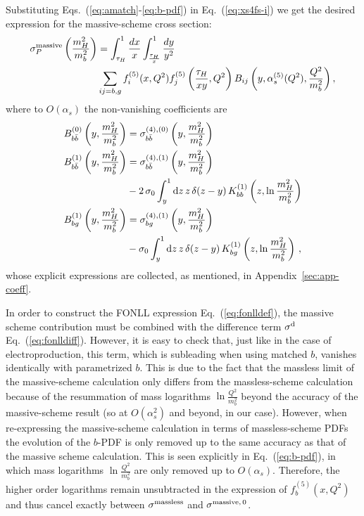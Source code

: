 Substituting Eqs.~(\ref{eq:amatch}-\ref{eq:b-pdf}) in
Eq.~(\ref{eq:xs4fs-i}) we get the desired expression for the
massive-scheme cross section:
\begin{equation}
  \label{massive:1}
  \begin{split}
  \sigma_P^{\rm
    massive}\left(\frac{m_H^2}{m_b^2}\right)&=
  \int_{\tau_H}^{1} \frac{dx}{x}\int_{\frac{\tau_H}{x}}^{1}
  \frac{dy}{y^2} \\
  &\sum_{ij=b,g}f_{i}^{(5)}(x,Q^2)f_j^{(5)}
  \left(\frac{\tau_H}{x y},Q^2\right)
  B_{ij}\left(y,\alpha_s^{(5)}(Q^2),
    \frac{Q^2}{m_b^2}\right),
  \end{split}
\end{equation}
where to $O(\alpha_s)$ the non-vanishing coefficients are 
\begin{align}
  \label{eq:change-of-scheme}
  B_{b\bar{b}}^{(0)}\left(y,\frac{m_H^2}{m_b^2}\right)  
    & = \sigma_{b\bar{b}}^{(4),(0)}\left(y,\frac{m_H^2}{m_b^2}\right) \\
  B_{b\bar{b}}^{(1)}\left(y,\frac{m_H^2}{m_b^2}\right)
    & = \sigma_{b\bar{b}}^{(4),(1)}\left(y,\frac{m_H^2}{m_b^2}\right) \nonumber\\ 
    & - 2\,\sigma_0
      \int_{y}^{1}{\rm d} z \,z\,\delta(z-y)\,
      K_{bb}^{(1)}\left(z,\ln\frac{m_H^2}{m_b^2}\right)\\
  B_{bg}^{(1)}\left(y,\frac{m_H^2}{m_b^2}\right)
    & = \sigma_{bg}^{(4),(1)}\left(y,\frac{m_H^2}{m_b^2}\right) \nonumber \\
    &  -\sigma_0
      \int_{y}^{1}{\rm d} z \,z\,\delta(z-y)\,
      K_{bg}^{(1)}\left(z,\ln\frac{m_H^2}{m_b^2}\right)\,,
\end{align}
whose explicit expressions are collected, as mentioned, in Appendix~\ref{sec:app-coeff}.

In order to construct the FONLL expression Eq.~(\ref{eq:fonlldef}), the
massive scheme contribution must be combined with the difference term
$\sigma ^{\rm d}$ Eq.~(\ref{eq:fonlldiff}). However, it is easy to
check that, just like in the case of
electroproduction\cite{Ball:2015tna,Ball:2015dpa},
this term, which is subleading when using matched $b$, vanishes
identically with parametrized $b$. This is due to the
fact that the massless limit of the massive-scheme calculation only
differs from the massless-scheme calculation because of the resummation
of mass logarithms $\ln\frac{Q^2}{m_b^2}$ beyond the accuracy of the
massive-scheme result (so at $O(\alpha_s^2)$ and beyond, in our
case). However, when re-expressing the massive-scheme calculation in
terms of massless-scheme PDFs the evolution of the $b$-PDF is only
removed up to the same accuracy as that of the massive scheme
calculation. This is seen explicitly in Eq.~(\ref{eq:b-pdf}), in which
mass logarithms  $\ln\frac{Q^2}{m_b^2}$ are only removed up to
$O(\alpha_s)$. Therefore, the higher order logarithms remain unsubtracted in
the expression of $f_b^{(5)} (x,Q^2)$ and thus cancel exactly between
$\sigma^{\rm massless}$ and $\sigma^{\rm massive,\,0}$.

